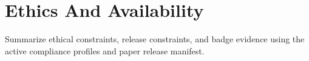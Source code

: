 \section{Ethics And Availability}

Summarize ethical constraints, release constraints, and badge evidence using the
active compliance profiles and paper release manifest.
